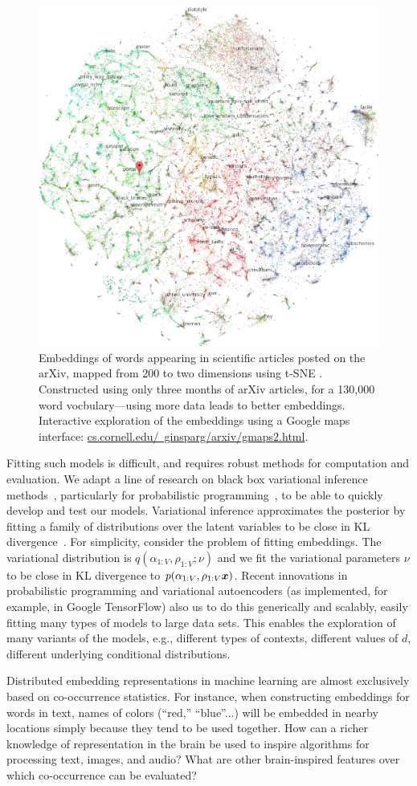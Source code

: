 \setlength{\columnsep}{20pt}
\begin{figure}
\centering
\includegraphics[width=.44\textwidth]{figs/ginsparg}
\caption{\small Embeddings of words appearing in scientific articles
posted on the arXiv, mapped from 200 to two dimensions using
t-SNE \citep{ginsparg}. Constructed using only three months of
arXiv articles, for a 130,000 word vocbulary---using more data
leads to better embeddings.
Interactive exploration of the embeddings
using a Google maps interface: \href{http://www.cs.cornell.edu/~ginsparg/arxiv/gmaps2.html}{cs.cornell.edu/~ginsparg/arxiv/gmaps2.html}.
}
    \label{fig:arxiv}
    \vskip2pt
\end{figure}

Fitting such models is
difficult, and requires robust methods for computation and
evaluation.  We adapt a line of research on black
box variational inference methods~\citep{Ranganath:2014}, particularly
for probabilistic programming~\citep{Kucukelbir:2017,Tran:2017}, 
to be able to quickly develop and test our models.
Variational inference approximates the posterior by fitting a family
of distributions over the latent variables to be close in KL
divergence~\citep{Jordan:1999,Blei:2017}.  For simplicity, consider
the problem of fitting embeddings.  The variational
distribution is $q(\alpha_{1:V}, \rho_{1:V} ; \nu)$ and we fit the
variational parameters $\nu$ to be close in KL divergence to
$p(\alpha_{1:V}, \rho_{1:V} \g \mbx)$.  Recent innovations in
probabilistic programming and variational autoencoders
\citep{kingma} (as implemented, for example, in Google TensorFlow) also us to do this generically and
scalably, easily fitting many types of models to large
data sets.  This enables the exploration of many variants of the
models, e.g., different types of contexts, different values of $d$,
different underlying conditional distributions.


Distributed embedding representations in machine learning are almost
exclusively based on co-occurrence statistics. For instance, when
constructing embeddings for words in text, names of colors (``red,''
``blue''...) will be embedded in nearby locations simply because they
tend to be used together. How can a richer knowledge of representation
in the brain be used to inspire algorithms for processing text,
images, and audio? What are other brain-inspired features over which
co-occurrence can be evaluated?

